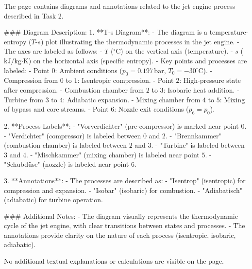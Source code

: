 The page contains diagrams and annotations related to the jet engine process described in Task 2.  

### Diagram Description:  
1. **T-s Diagram**:  
   - The diagram is a temperature-entropy (\( T \)-\( s \)) plot illustrating the thermodynamic processes in the jet engine.  
   - The axes are labeled as follows:  
     - \( T \) (\( ^\circ \text{C} \)) on the vertical axis (temperature).  
     - \( s \) (\( \text{kJ/kg·K} \)) on the horizontal axis (specific entropy).  
   - Key points and processes are labeled:  
     - Point \( 0 \): Ambient conditions (\( p_0 = 0.197 \, \text{bar} \), \( T_0 = -30^\circ \text{C} \)).  
     - Compression from \( 0 \) to \( 1 \): Isentropic compression.  
     - Point \( 2 \): High-pressure state after compression.  
     - Combustion chamber from \( 2 \) to \( 3 \): Isobaric heat addition.  
     - Turbine from \( 3 \) to \( 4 \): Adiabatic expansion.  
     - Mixing chamber from \( 4 \) to \( 5 \): Mixing of bypass and core streams.  
     - Point \( 6 \): Nozzle exit conditions (\( p_6 = p_0 \)).  

2. **Process Labels**:  
   - "Vorverdichter" (pre-compressor) is marked near point \( 0 \).  
   - "Verdichter" (compressor) is labeled between \( 0 \) and \( 2 \).  
   - "Brennkammer" (combustion chamber) is labeled between \( 2 \) and \( 3 \).  
   - "Turbine" is labeled between \( 3 \) and \( 4 \).  
   - "Mischkammer" (mixing chamber) is labeled near point \( 5 \).  
   - "Schubdüse" (nozzle) is labeled near point \( 6 \).  

3. **Annotations**:  
   - The processes are described as:  
     - "Isentrop" (isentropic) for compression and expansion.  
     - "Isobar" (isobaric) for combustion.  
     - "Adiabatisch" (adiabatic) for turbine operation.  

### Additional Notes:  
- The diagram visually represents the thermodynamic cycle of the jet engine, with clear transitions between states and processes.  
- The annotations provide clarity on the nature of each process (isentropic, isobaric, adiabatic).  

No additional textual explanations or calculations are visible on the page.
